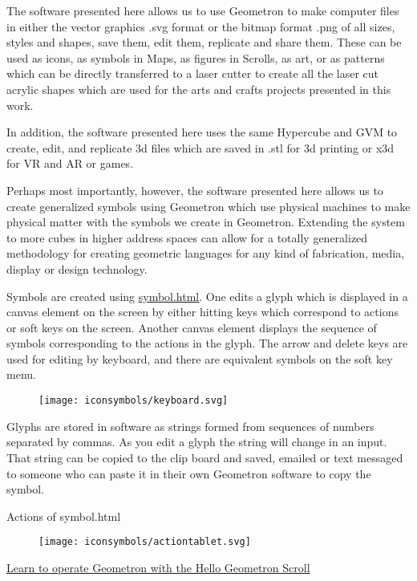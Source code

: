 The software presented here allows us to use Geometron to make computer
files in either the vector graphics .svg format or the bitmap format
.png of all sizes, styles and shapes, save them, edit them, replicate
and share them. These can be used as icons, as symbols in Maps, as
figures in Scrolls, as art, or as patterns which can be directly
transferred to a laser cutter to create all the laser cut acrylic shapes
which are used for the arts and crafts projects presented in this work.

In addition, the software presented here uses the same Hypercube and GVM
to create, edit, and replicate 3d files which are saved in .stl for 3d
printing or x3d for VR and AR or games.

Perhaps most importantly, however, the software presented here allows us
to create generalized symbols using Geometron which use physical
machines to make physical matter with the symbols we create in
Geometron. Extending the system to more cubes in higher address spaces
can allow for a totally generalized methodology for creating geometric
languages for any kind of fabrication, media, display or design
technology.

Symbols are created using \url{symbol.html}. One edits a glyph which is
displayed in a canvas element on the screen by either hitting keys which
correspond to actions or soft keys on the screen. Another canvas element
displays the sequence of symbols corresponding to the actions in the
glyph. The arrow and delete keys are used for editing by keyboard, and
there are equivalent symbols on the soft key menu.

\begin{figure}[htbp]
\centering
\texttt{[image: iconsymbols/keyboard.svg]}
\caption{}
\end{figure}

Glyphs are stored in software as strings formed from sequences of
numbers separated by commas. As you edit a glyph the string will change
in an input. That string can be copied to the clip board and saved,
emailed or text messaged to someone who can paste it in their own
Geometron software to copy the symbol.

Actions of symbol.html

\begin{figure}[htbp]
\centering
\texttt{[image: iconsymbols/actiontablet.svg]}
\caption{}
\end{figure}

\href{scrolls/hellogeometron}{Learn to operate Geometron with the Hello
Geometron Scroll}


